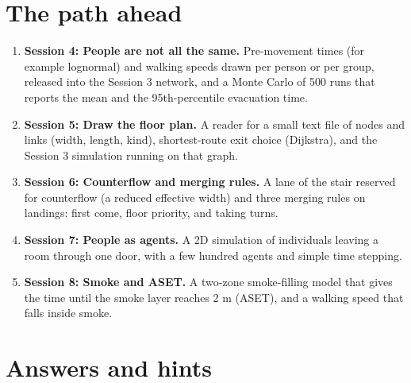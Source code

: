 \documentclass[11pt,a4paper]{article}
\begin{document}
\section{The path ahead}
\begin{enumerate}[nosep]
\item \textbf{Session 4: People are not all the same.} Pre-movement times (for example lognormal) and walking speeds drawn per person or per group, released into the Session 3 network, and a Monte Carlo of 500 runs that reports the mean and the 95th-percentile evacuation time.
\item \textbf{Session 5: Draw the floor plan.} A reader for a small text file of nodes and links (width, length, kind), shortest-route exit choice (Dijkstra), and the Session 3 simulation running on that graph.
\item \textbf{Session 6: Counterflow and merging rules.} A lane of the stair reserved for counterflow (a reduced effective width) and three merging rules on landings: first come, floor priority, and taking turns.
\item \textbf{Session 7: People as agents.} A 2D simulation of individuals leaving a room through one door, with a few hundred agents and simple time stepping.
\item \textbf{Session 8: Smoke and ASET.} A two-zone smoke-filling model that gives the time until the smoke layer reaches 2 m (ASET), and a walking speed that falls inside smoke.
\end{enumerate}

\section{Answers and hints}
\end{document}
